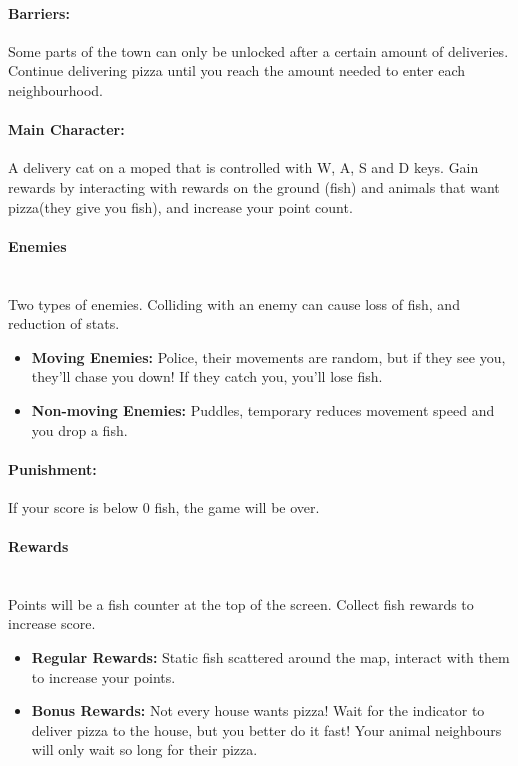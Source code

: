 \documentclass{article}
\begin{document}
\paragraph{Barriers:}Some parts of the town can only be unlocked after a certain amount of deliveries. Continue delivering pizza until you reach the amount needed to enter each neighbourhood.

\paragraph{Main Character:}A delivery cat on a moped that is controlled with W, A, S and D keys. Gain rewards by interacting with rewards on the ground (fish) and animals that want pizza(they give you fish), and increase your point count.

\paragraph{\centering \large{\textbf{Enemies}}\\}~\\
Two types of enemies. Colliding with an enemy can cause loss of fish, and reduction of stats.

\begin{itemize}
	\item \textbf{Moving Enemies:} Police, their movements are random, but if they see you, they'll chase you down! If they catch you, you'll lose fish.
	\item \textbf{Non-moving Enemies:} Puddles, temporary reduces movement speed and you drop a fish.
\end{itemize}

\paragraph{Punishment:} If your score is below 0 fish, the game will be over.

\bigskip
\paragraph{\centering \large{\textbf{Rewards}}\\}~\\
Points will be a fish counter at the top of the screen. Collect fish rewards to increase score.

\begin{itemize}
	\item \textbf{Regular Rewards:} Static fish scattered around the map, interact with them to increase your points.
	\item \textbf{Bonus Rewards:} Not every house wants pizza! Wait for the indicator to deliver pizza to the house, but you better do it fast! Your animal neighbours will only wait so long for their pizza.
\end{itemize}
\end{document}
